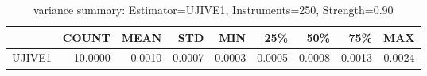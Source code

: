 \begin{table}[ht]
\centering
\caption{variance summary: Estimator=UJIVE1, Instruments=250, Strength=0.90}
\begin{tabular}{lrrrrrrrr}
\toprule
 & COUNT & MEAN & STD & MIN & 25\% & 50\% & 75\% & MAX \\
\midrule
UJIVE1 & 10.0000 & 0.0010 & 0.0007 & 0.0003 & 0.0005 & 0.0008 & 0.0013 & 0.0024 \\
\bottomrule
\end{tabular}
\end{table}
